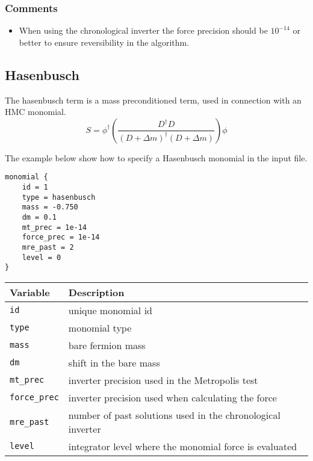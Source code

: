 \documentclass[12pt]{article}
\begin{document}
\subsubsection*{Comments}
\begin{itemize}
 \item When using the chronological inverter the force precision should be $10^{-14}$ or better to ensure reversibility in the algorithm.
\end{itemize}

\newpage
\subsection*{Hasenbusch}
The hasenbusch term is a mass preconditioned term, used in connection with an HMC monomial.
\begin{equation}
 S = \phi^\dagger\left(\frac{D^\dagger D}{(D+\Delta m)^\dagger (D+\Delta m)}\right)\phi
\end{equation}

The example below show how to specify a Hasenbusch monomial in the input file.
\begin{center}
\begin{minipage}{55mm}
\begin{framed}
\begin{verbatim}
monomial {
    id = 1
    type = hasenbusch
    mass = -0.750
    dm = 0.1
    mt_prec = 1e-14
    force_prec = 1e-14
    mre_past = 2
    level = 0
}
\end{verbatim}
\vspace{-5mm}
\end{framed}
\end{minipage}
\end{center}

\vspace{2mm}

\begin{center}
\begin{tabular}{l|l}
 Variable & Description \\
 \hline
 \verb|id|         & unique monomial id \\
 \verb|type|       & monomial type \\
 \verb|mass|       & bare fermion mass \\
 \verb|dm|         & shift in the bare mass \\
 \verb|mt_prec|    & inverter precision used in the Metropolis test \\
 \verb|force_prec| & inverter precision used when calculating the force \\
 \verb|mre_past|   & number of past solutions used in the chronological inverter \\
 \verb|level|      & integrator level where the monomial force is evaluated
\end{tabular}
\end{center}
\end{document}
